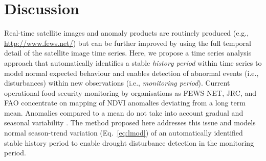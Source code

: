 \documentclass[authoryear,preprint,review,10pt]{elsarticle}
\begin{document}
\section{Discussion} \label{sec:Disc}

Real-time satellite images and anomaly products are routinely produced (e.g., \url{http://www.fews.net/}) but can be further improved by using the full temporal detail of the satellite image time series. Here, we propose a time series analysis approach that automatically identifies a stable \emph{history period} within time series to model normal expected behaviour and enables detection of abnormal events (i.e., disturbances) within new observations (i.e., \emph{monitoring period}). Current operational food security monitoring by organisations as FEWS-NET, JRC, and FAO concentrate on mapping of NDVI anomalies deviating from a long term mean. Anomalies compared to a mean do not take into account gradual and seasonal variability \citep{Vrieling:2011da}. The method proposed here addresses this issue and models normal season-trend variation (Eq.~\ref{eq:lmod}) of an automatically identified stable history period to enable drought disturbance detection in the monitoring period.
\end{document}
